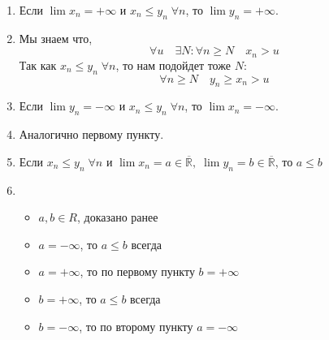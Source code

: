 \documentclass[12pt,letterpaper]{report}
\makeatletter
\renewenvironment{proof}[1][\proofname]{%
   \par\pushQED{\qed}\normalfont%
   \topsep6\p@\@plus6\p@\relax
   \trivlist\item[\hskip\labelsep\bfseries#1\@addpunct{.}]%
   \ignorespaces
}{%
   \popQED\endtrivlist\@endpefalse
}
\makeatother
\begin{document}
\begin{enumerate}
    \item Если $\lim x_n = +\infty$ и $x_n \leqslant y_n \;\forall n$, то $\lim y_n = +\infty$.
    \begin{proof}
        Мы знаем что,
        \[ \forall u\quad \exists N: \forall n \geqslant N \quad x_n > u  \]
        Так как $x_n \leqslant y_n \;\forall n$, то нам подойдет тоже $N$:
        \[ \forall n \geqslant N \quad y_n \geqslant x_n > u  \]
    \end{proof}
    \item Если $\lim y_n = -\infty$ и $x_n \leqslant y_n \;\forall n$, то $\lim x_n = -\infty$.
    \begin{proof}
        Аналогично первому пункту.
    \end{proof}
    \item Если $x_n \leqslant y_n \;\forall n$ и $\lim x_n = a \in \overline{\mathbb{R}},\; \lim y_n = b \in \overline{\mathbb{R}}$, то $a \leqslant b$
    \begin{proof} \quad \\
    \begin{itemize}
        \item $a, b \in R$, доказано ранее
        \item $a = -\infty$, то $a \leqslant b$ всегда
        \item $a = +\infty$, то по первому пункту $b = +\infty$
        \item $b = +\infty$, то $a \leqslant b$ всегда
        \item $b = -\infty$, то по второму пункту $a = -\infty$
    \end{itemize}
    \end{proof}
\end{enumerate}
\end{document}
